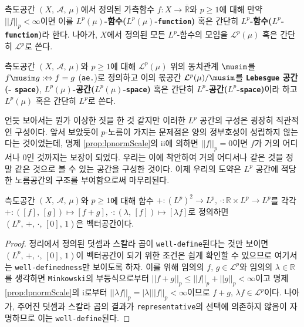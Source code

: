 \begin{definition}
    측도공간 $(X,\,\mathcal{A},\,\mu)$에서 정의된 가측함수 $f:X\to\overline{\mathbb{R}}$와 $p\geq1$에 대해 만약 $||f||_p<\infty$이면 이를 \textbf{$L^p(\mu)$-함수($L^p(\mu)$-\texttt{function})} 혹은 간단히 \textbf{$L^p$-함수($L^p$-\texttt{function})}라 한다. 나아가, $X$에서 정의된 모든 $L^p$-함수의 모임을 $\mathcal{L}^p(\mu)$ 혹은 간단히 $\mathcal{L}^p$로 쓴다.
\end{definition}

\begin{definition}
    측도공간 $(X,\,\mathcal{A},\,\mu)$와 $p\geq1$에 대해 $\mathcal{L}^p(\mu)$ 위의 동치관계 $\musim$를 $f\musim g:\Leftrightarrow f=g$ (\texttt{ae.})로 정의하고 이의 몫공간 $\mathcal{L}^p(\mu)/\musim$를 \textbf{\texttt{Lebesgue} 공간(- \texttt{space})}, \textbf{$L^p(\mu)$-공간($L^p(\mu)$-\texttt{space})} 혹은 간단히 \textbf{$L^p$-공간($L^p$-\texttt{space})}이라 하고 $L^p(\mu)$ 혹은 간단히 $L^p$로 쓴다.
\end{definition}

언듯 보아서는 뭔가 이상한 짓을 한 것 같지만 이러한 $L^p$ 공간의 구성은 굉장히 직관적인 구성이다. 앞서 보았듯이 $p$-노름이 가지는 문제점은 양의 정부호성이 성립하지 않는다는 것이었는데, 명제 \ref{prop:lpnormScale}의 ii에 의하면 $||f||_p=0$이면 $f$가 거의 어디서나 0인 것까지는 보장이 되었다. 우리는 이에 착안하여 거의 어디서나 같은 것을 정말 같은 것으로 볼 수 있는 공간을 구성한 것이다. 이제 우리의 도약은 $L^p$ 공간에 적당한 노름공간의 구조를 부여함으로써 마무리된다.

\begin{proposition}
    측도공간 $(X,\,\mathcal{A},\,\mu)$와 $p\geq1$에 대해 함수 $+:(L^p)^2\to L^p,\,\cdot:\mathbb{R}\times L^p\to L^p$를 각각 $+:([f],\,[g])\mapsto[f+g],\,\cdot:(\lambda,\,[f])\mapsto[\lambda f]$로 정의하면 $(L^p,\,+,\,\cdot,\,[0],\,1)$은 벡터공간이다.
\end{proposition}

\begin{proof}
    정리에서 정의된 덧셈과 스칼라 곱이 \texttt{well-define}된다는 것만 보이면 $(L^p,\,+,\,\cdot,\,[0],\,1)$이 벡터공간이 되기 위한 조건은 쉽게 확인할 수 있으므로 여기서는 \texttt{well-definedness}만 보이도록 하자. 이를 위해 임의의 $f,\,g\in\mathcal{L}^p$와 임의의 $\lambda\in\mathbb{R}$를 생각하면 \texttt{Minkowski}의 부등식으로부터 $||f+g||_p\leq||f||_p+||g||_p<\infty$이고 명제 \ref{prop:lpnormScale}의 i로부터 $||\lambda f||_p=|\lambda|||f||_p<\infty$이므로 $f+g,\,\lambda f\in\mathcal{L}^p$이다. 나아가, 주어진 덧셈과 스칼라 곱의 결과가 \texttt{representative}의 선택에 의존하지 않음이 자명하므로 이는 \texttt{well-define}된다.
\end{proof}

